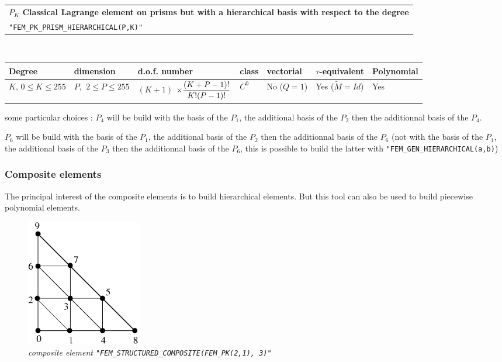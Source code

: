 \documentclass[10pt,a4paper]{article}
\begin{document}
\begin{center}
\begin{tabular}{|m{16.109cm}|} \hline 
{\bf $P_{K}$ Classical Lagrange element on prisms but with a hierarchical basis with respect to the degree}\\
{\tt "FEM\_PK\_PRISM\_HIERARCHICAL(P,K)"} 
\end{tabular} \\ \vspace{-1pt} 
\begin{tabular}{|m{2cm}|m{2cm}|m{2.5cm}|m{1.5cm}|m{1.5cm}|m{2cm}|m{2cm}|} \hline 
Degree & dimension & d.o.f. number & class & vectorial & \mbox{$\tau$-equivalent} & Polynomial\\ \hline
\small \mbox{$K$}, \small \mbox{$0 \leq K\leq 255$} & \small $P$, \mbox{$\ 2 \leq P \leq 255$} & \mbox{$(K+1)$} \mbox{$\times {\displaystyle\frac{\displaystyle(K+P-1)!}{\displaystyle K! (P-1)!}}$} & $C^0$ & No \mbox{($Q = 1$)} & Yes \mbox{($\tilde{M} = Id$)}  & Yes\\ \hline
\end{tabular}
\end{center}

some particular choices : $P_4$ will be build with the basis of the $P_1$, the additional basis of the $P_2$ then the additionnal basis of the $P_4$.

$P_6$ will be build  with the basis of the $P_1$, the additional basis of the $P_2$ then the additionnal basis of the $P_6$ (not with the basis of the $P_1$, 
the additional basis of the $P_3$ then the additionnal basis of the $P_6$, this is possible to build the latter with {\tt "FEM\_GEN\_HIERARCHICAL(a,b)})

\subsubsection{Composite elements}

The principal interest of the composite elements is to build hierarchical elements. But this tool can also be used to build piecewise polynomial elements.

\begin{figure}[H]
  \begin{center}
    \includegraphics[width=5cm,angle=0]{getfemlist_triangle_P1comp.eps}
  \end{center}
  \caption{ \it composite element {\tt "FEM\_STRUCTURED\_COMPOSITE(FEM\_PK(2,1), 3)"}} 
  \label{fig:triangle_comp}
\end{figure}
\end{document}

